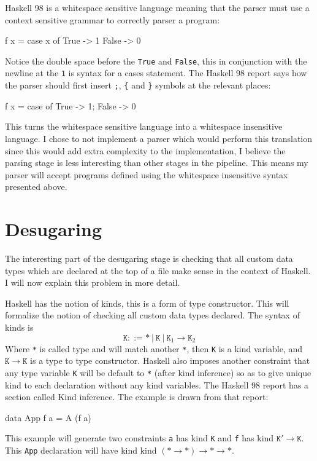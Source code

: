 \documentclass[float=false, crop=false]{standalone}
\begin{document}
Haskell 98 is a whitespace sensitive language meaning that the parser must use a
context sensitive grammar to correctly parser a program:
\begin{HaskellLst}
f x = case x of 
  True  -> 1
  False -> 0
\end{HaskellLst}
Notice the double space before the \texttt{True} and \texttt{False}, this in conjunction with the
newline at the \texttt{1} is syntax for a cases statement. The Haskell 98 report
says how the parser should first insert \texttt{;},  \texttt{\{} and \texttt{\}} symbols at the 
relevant places:
\begin{HaskellLst}
f x = case of {
  True  -> 1;
  False -> 0
}
\end{HaskellLst}
This turns the whitespace sensitive language into a whitespace insensitive language. I chose to 
not implement a parser which would perform this translation since this would add extra complexity to the
implementation, I believe the parsing stage is less interesting than other stages in the pipeline.
This means my parser will accept programs defined using the whitespace insensitive 
syntax presented above.


\section{Desugaring}

The interesting part of the desugaring stage is 
checking that all custom data types which are declared at the top of a
file make sense in the context of Haskell. I will now explain this
problem in more detail.

Haskell has the notion of kinds, this is a form of type constructor. This will
formalize the notion of checking all custom data types declared.
The syntax of kinds is
\[ \mathtt{K} ::= \mathtt{*}\ |\ \mathtt{K}\  |\ \mathtt{K}_1 \rightarrow \mathtt{K}_2 \] 
Where \texttt{*} is called type and will match another
\texttt{*}, then \texttt{K} is a kind variable, and $\mathtt{K} \rightarrow \mathtt{K}$ is a type to type constructor.
Haskell also imposes another constraint that any type variable \texttt{K} will
be default to \texttt{*} (after kind inference) so as to give 
unique kind to each declaration without any kind variables.
The Haskell 98 report has a section \cite[4.6]{haskell98-spec} called Kind inference.
The example is drawn from that report:
\begin{HaskellLst}
data App f a = A (f a)
\end{HaskellLst}
This example will generate two constraints \texttt{a} has kind \texttt{K} and \texttt{f} 
has kind $\mathtt{K'} \rightarrow \mathtt{K}$. This \texttt{App} declaration will have kind  
kind $(\mathtt{*}\rightarrow\mathtt{*})\rightarrow\mathtt{*}\rightarrow
\mathtt{*}$.
\end{document}
